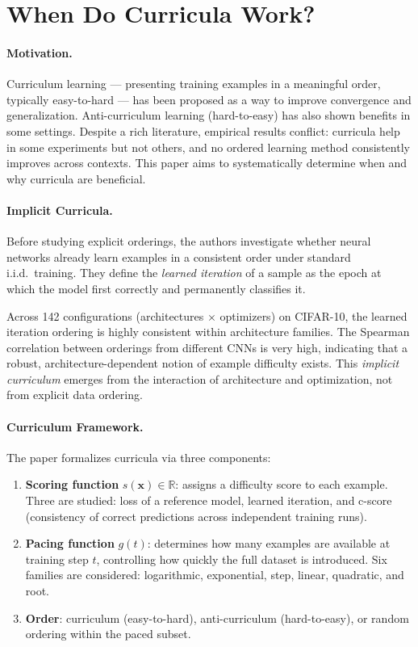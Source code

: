 \documentclass[12pt]{article}
\begin{document}
\psetheader %

\section*{When Do Curricula Work?}

\paragraph{Motivation.}
Curriculum learning --- presenting training examples in a meaningful order,
typically easy-to-hard --- has been proposed as a way to improve convergence
and generalization. Anti-curriculum learning (hard-to-easy) has also shown
benefits in some settings. Despite a rich literature, empirical results
conflict: curricula help in some experiments but not others, and no ordered
learning method consistently improves across contexts. This paper aims to
systematically determine when and why curricula are beneficial.

\paragraph{Implicit Curricula.}
Before studying explicit orderings, the authors investigate whether neural
networks already learn examples in a consistent order under standard i.i.d.\
training. They define the \emph{learned iteration} of a sample as the epoch
at which the model first correctly and permanently classifies it.

Across 142 configurations (architectures $\times$ optimizers) on CIFAR-10,
the learned iteration ordering is highly consistent within architecture
families. The Spearman correlation between orderings from different CNNs
is very high, indicating that a robust, architecture-dependent notion of
example difficulty exists. This \emph{implicit curriculum} emerges from the
interaction of architecture and optimization, not from explicit data ordering.

\paragraph{Curriculum Framework.}
The paper formalizes curricula via three components:

\begin{enumerate}
		\item \textbf{Scoring function} $s(\mathbf{x}) \in \mathbb{R}$: assigns
				a difficulty score to each example. Three are studied: loss of a
				reference model, learned iteration, and c-score (consistency of
				correct predictions across independent training runs).
		\item \textbf{Pacing function} $g(t)$: determines how many examples are
				available at training step $t$, controlling how quickly the full
				dataset is introduced. Six families are considered: logarithmic,
				exponential, step, linear, quadratic, and root.
		\item \textbf{Order}: curriculum (easy-to-hard), anti-curriculum
				(hard-to-easy), or random ordering within the paced subset.
\end{enumerate}
\end{document}
